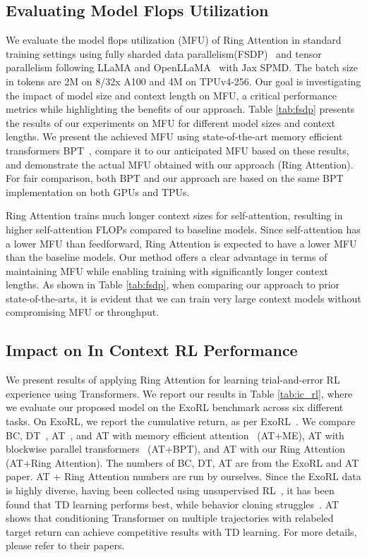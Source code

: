 \subsection{Evaluating Model Flops Utilization}
\label{sec:fsdp}
We evaluate the model flops utilization (MFU) of {Ring Attention} in standard training settings using fully sharded data parallelism(FSDP)~\citep{fbFullySharded} and tensor parallelism following LLaMA and OpenLLaMA~\citep{touvron2023llama, openllama2023} with Jax SPMD. The batch size in tokens are 2M on 8/32x A100 and 4M on TPUv4-256. Our goal is investigating the impact of model size and context length on MFU, a critical performance metrics while highlighting the benefits of our approach. Table \ref{tab:fsdp} presents the results of our experiments on MFU for different model sizes and context lengths. We present the achieved MFU using state-of-the-art memory efficient transformers BPT~\citep{liu2023blockwise}, compare it to our anticipated MFU based on these results, and demonstrate the actual MFU obtained with our approach ({Ring Attention}). For fair comparison, both BPT and our approach are based on the same BPT implementation on both GPUs and TPUs.

{Ring Attention} trains much longer context sizes for self-attention, resulting in higher self-attention FLOPs compared to baseline models. Since self-attention has a lower MFU than feedforward, {Ring Attention} is expected to have a lower MFU than the baseline models. Our method offers a clear advantage in terms of maintaining MFU while enabling training with significantly longer context lengths. As shown in Table \ref{tab:fsdp}, when comparing our approach to prior state-of-the-arts, it is evident that we can train very large context models without compromising MFU or throughput.

\subsection{Impact on In Context RL Performance} We present results of applying {Ring Attention} for learning trial-and-error RL experience using Transformers. We report our results in Table \ref{tab:ic_rl}, where we evaluate our proposed model on the ExoRL benchmark across six different tasks. On ExoRL, we report the cumulative return, as per ExoRL~\citep{yarats2022don}. We compare BC, DT~\citep{chen2021decision}, AT~\citep{liu2023agent}, and AT with memory efficient attention~\citep{rabe2021self} (AT+ME), AT with blockwise parallel transformers~\citep{liu2023blockwise} (AT+BPT), and AT with our {Ring Attention} (AT+{Ring Attention}). The numbers of BC, DT, AT are from the ExoRL and AT paper. AT + {Ring Attention} numbers are run by ourselves. Since the ExoRL data is highly diverse, having been collected using unsupervised RL~\citep{laskin2021urlb}, it has been found that TD learning performs best, while behavior cloning struggles~\citep{yarats2022don}. AT~\citep{liu2023agent} shows that conditioning Transformer on multiple trajectories with relabeled target return can achieve competitive results with TD learning. For more details, please refer to their papers.

